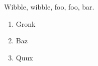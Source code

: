\documentclass{article}
\begin{document}
Wibble, wibble, foo, foo, bar.
 
\begin{enumerate}
  \item Gronk
  \item Baz
  \item Quux
\end{enumerate}

\printindex[list]
\printindex
\end{document}
